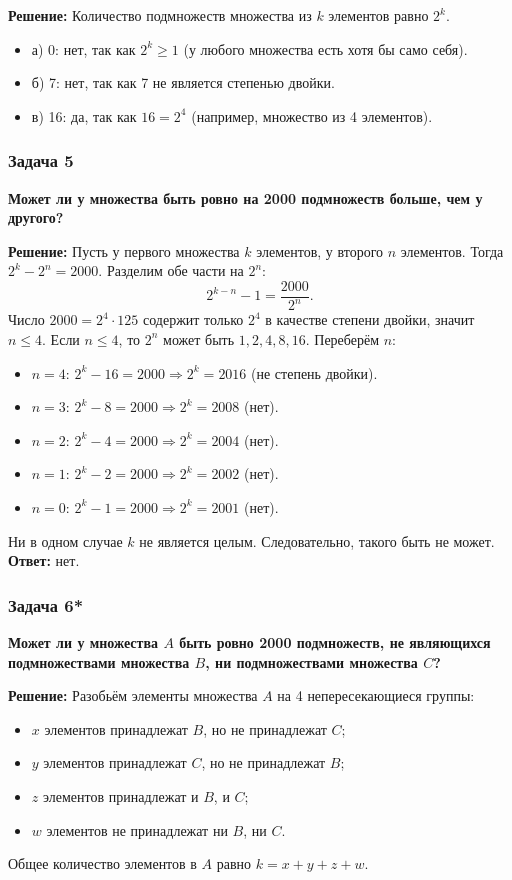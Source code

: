 \documentclass[12pt, a4paper]{article}
\begin{document}
\textbf{Решение:}
Количество подмножеств множества из \(k\) элементов равно \(2^k\).
\begin{itemize}
    \item а) 0: нет, так как \(2^k \ge 1\) (у любого множества есть хотя бы само себя).
    \item б) 7: нет, так как 7 не является степенью двойки.
    \item в) 16: да, так как \(16 = 2^4\) (например, множество из 4 элементов).
\end{itemize}

\subsubsection*{Задача 5}
\textbf{Может ли у множества быть ровно на 2000 подмножеств больше, чем у другого?}

\textbf{Решение:}
Пусть у первого множества \(k\) элементов, у второго \(n\) элементов. Тогда \(2^k - 2^n = 2000\).
Разделим обе части на \(2^n\):
\[
2^{k-n} - 1 = \frac{2000}{2^n}.
\]
Число \(2000 = 2^4 \cdot 125\) содержит только \(2^4\) в качестве степени двойки, значит \(n \le 4\).
Если \(n \le 4\), то \(2^n\) может быть \(1, 2, 4, 8, 16\).
Переберём \(n\):
\begin{itemize}
    \item \(n=4\): \(2^k - 16 = 2000 \Rightarrow 2^k = 2016\) (не степень двойки).
    \item \(n=3\): \(2^k - 8 = 2000 \Rightarrow 2^k = 2008\) (нет).
    \item \(n=2\): \(2^k - 4 = 2000 \Rightarrow 2^k = 2004\) (нет).
    \item \(n=1\): \(2^k - 2 = 2000 \Rightarrow 2^k = 2002\) (нет).
    \item \(n=0\): \(2^k - 1 = 2000 \Rightarrow 2^k = 2001\) (нет).
\end{itemize}
Ни в одном случае \(k\) не является целым. Следовательно, такого быть не может.
\textbf{Ответ:} нет.

\subsubsection*{Задача 6*}
\textbf{Может ли у множества \(A\) быть ровно 2000 подмножеств, не являющихся подмножествами множества \(B\), ни подмножествами множества \(C\)?}

\textbf{Решение:}
Разобьём элементы множества \(A\) на 4 непересекающиеся группы:
\begin{itemize}
    \item \(x\) элементов принадлежат \(B\), но не принадлежат \(C\);
    \item \(y\) элементов принадлежат \(C\), но не принадлежат \(B\);
    \item \(z\) элементов принадлежат и \(B\), и \(C\);
    \item \(w\) элементов не принадлежат ни \(B\), ни \(C\).
\end{itemize}
Общее количество элементов в \(A\) равно \(k = x + y + z + w\).
\end{document}

